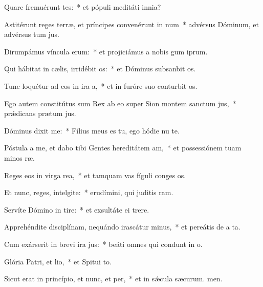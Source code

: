\item Quare fremuérunt tes:~* et pópuli meditáti  innia?
\item Astitérunt reges terræ, et príncipes convenérunt in num~* advérsus Dóminum, et advérsus tum jus.
\item Dirumpámus víncula erum:~* et projiciámus a nobis gum iprum.
\item Qui hábitat in cælis, irridébit os:~* et Dóminus subsanbit os.
\item Tunc loquétur ad eos in ira a,~* et in furóre suo conturbit os.
\item Ego autem constitútus sum Rex ab eo super Sion montem sanctum jus,~* prǽdicans prætum jus.
\item Dóminus dixit  me:~* Fílius meus es tu, ego hódie nu te.
\item Póstula a me, et dabo tibi Gentes hereditátem am,~* et possessiónem tuam minos ræ.
\item Reges eos in virga rea,~* et tamquam vas fíguli conges os.
\item Et nunc, reges, intelgite:~* erudímini, qui juditis ram.
\item Servíte Dómino in tire:~* et exsultáte ei  trere.
\item Apprehéndite disciplínam, nequándo irascátur minus,~* et pereátis de a ta.
\item Cum exárserit in brevi ira jus:~* beáti omnes qui condunt in o.
\item Glória Patri, et lio,~* et Spitui to.
\item Sicut erat in princípio, et nunc, et per,~* et in sǽcula sæcurum. men.
